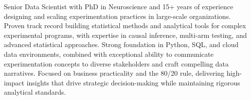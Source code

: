 

\begin{cvparagraph}


 Senior Data Scientist with PhD in Neuroscience and 15+ years of experience designing and scaling experimentation practices in large-scale organizations. Proven track record building statistical methods and analytical tools for complex experimental programs, with expertise in causal inference, multi-arm testing, and advanced statistical approaches. Strong foundation in Python, SQL, and cloud data environments, combined with exceptional ability to communicate experimentation concepts to diverse stakeholders and craft compelling data narratives. Focused on business practicality and the 80/20 rule, delivering high-impact insights that drive strategic decision-making while maintaining rigorous analytical standards.
\end{cvparagraph}
